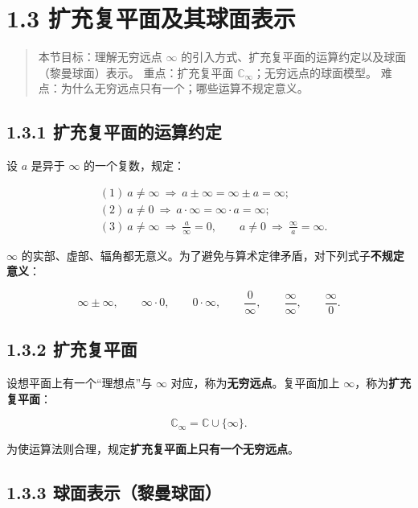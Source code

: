 \section{1.3
扩充复平面及其球面表示}\label{ux6269ux5145ux590dux5e73ux9762ux53caux5176ux7403ux9762ux8868ux793a}

\begin{quote}
本节目标：理解无穷远点 \(\infty\)
的引入方式、扩充复平面的运算约定以及球面（黎曼球面）表示。
重点：扩充复平面 \(\mathbb{C}_\infty\)；无穷远点的球面模型。
难点：为什么无穷远点只有一个；哪些运算不规定意义。
\end{quote}

\subsection{1.3.1
扩充复平面的运算约定}\label{ux6269ux5145ux590dux5e73ux9762ux7684ux8fd0ux7b97ux7ea6ux5b9a}

设 \(a\) 是异于 \(\infty\) 的一个复数，规定：

\[
\begin{aligned}
&(1)\ a\neq\infty \ \Rightarrow\ a\pm\infty = \infty\pm a = \infty;\\[2pt]
&(2)\ a\neq 0 \ \Rightarrow\ a\cdot\infty = \infty\cdot a = \infty;\\[2pt]
&(3)\ a\neq\infty \ \Rightarrow\ \frac{a}{\infty}=0,\qquad
a\neq 0 \ \Rightarrow\ \frac{\infty}{a}=\infty .
\end{aligned}
\]

\(\infty\)
的实部、虚部、辐角都无意义。为了避免与算术定律矛盾，对下列式子\textbf{不规定意义}：

\[
\infty\pm\infty,\qquad \infty\cdot 0,\qquad 0\cdot\infty,\qquad \frac{0}{\infty},\qquad \frac{\infty}{\infty},\qquad \frac{\infty}{0}.
\]

\subsection{1.3.2 扩充复平面}\label{ux6269ux5145ux590dux5e73ux9762}

设想平面上有一个``理想点''与 \(\infty\)
对应，称为\textbf{无穷远点}。复平面加上
\(\infty\)，称为\textbf{扩充复平面}：

\[
\mathbb{C}_\infty = \mathbb{C}\cup\{\infty\}.
\]

为使运算法则合理，规定\textbf{扩充复平面上只有一个无穷远点}。

\subsection{1.3.3
球面表示（黎曼球面）}\label{ux7403ux9762ux8868ux793aux9eceux66fcux7403ux9762}

